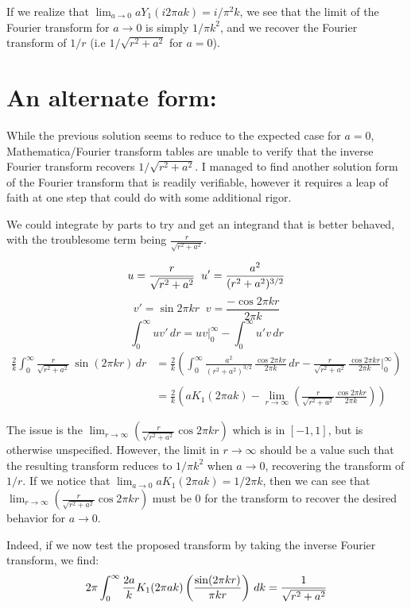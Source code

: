 \documentclass[letterpaper,10pt]{article}
\begin{document}
If we realize that $\lim_{a \to 0} a Y_1(i 2 \pi a k) = i/\pi^2 k$, we see that the limit of the Fourier transform for $a \to 0$ is simply $1/\pi k^2$, and we recover the Fourier transform of $1/r$ (i.e $1/\sqrt{r^2 + a^2}$ for $a=0$).

\vskip 0.1in
\section*{An alternate form:}
While the previous solution seems to reduce to the expected case for $a=0$, Mathematica/Fourier transform tables are unable to verify that the inverse Fourier transform recovers $1/\sqrt{r^2 + a^2}$. I managed to find another solution form of the Fourier transform that is readily verifiable, however it requires a leap of faith at one step that could do with some additional rigor.

We could integrate by parts to try and get an integrand that is better behaved, with the troublesome term being $\frac{r}{\sqrt{r^2+a^2}}$.

$$
u = \frac{r}{\sqrt{r^2+a^2}} \;\; u' = \frac{a^2}{(r^2+a^2)^{3/2}}\\\\
$$
$$
v' = \sin{2 \pi k r} \;\; v = \frac{- \cos{2 \pi k r}}{2 \pi k}
$$
$$
\int_0^\infty uv' \,dr = uv\Big|_0^\infty - \int_0^\infty u' v \,dr
$$
\begin{align*}
\frac{2}{k} \int_0^\infty \frac{r}{\sqrt{r^2+a^2}}\,\sin(2\pi kr)\,dr &= \frac{2}{k}\left( \int_0^\infty \frac{a^2}{(r^2+a^2)^{3/2}}\, \frac{\cos{2 \pi k r}}{2 \pi k}\,dr - 
\frac{r}{\sqrt{r^2+a^2}} \, \frac{ \cos{2 \pi k r}}{2 \pi k} \Big|_0^\infty \right) \\\\
&=\frac{2}{k} \left( a K_1(2 \pi a k) - \lim_{r \to \infty}\left( \frac{r}{\sqrt{r^2+a^2}} \frac{\cos{2 \pi k r}}{2 \pi k} \right) \right) 
\end{align*}

The issue is the $\lim_{r \to \infty}\left( \frac{r}{\sqrt{r^2+a^2}} \cos{2 \pi k r}\right)$ which is in $[-1,1]$, but is otherwise unspecified. However, the limit  in $r \to \infty$ should be a value such that the resulting transform reduces to $1/\pi k^2$ when $a \to 0$, recovering the transform of $1/r$. If we notice that  $\lim_{a \to 0} a K_1(2 \pi a k) = 1/2 \pi k$, then we can see that $\lim_{r \to \infty}\left( \frac{r}{\sqrt{r^2+a^2}} \cos{2 \pi k r}\right)$ must be 0 for the transform to recover the desired behavior for $a \to 0$.

Indeed, if we now test the proposed transform by taking the inverse Fourier transform, we find:
$$
2\pi \int_0^\infty \frac{2a}{k} K_1(2 \pi a k) \left(\frac{\sin(2\pi kr)}{\pi k r}\right)\,dk = \frac{1}{\sqrt{r^2+a^2}}\\\\
$$
\end{document}

